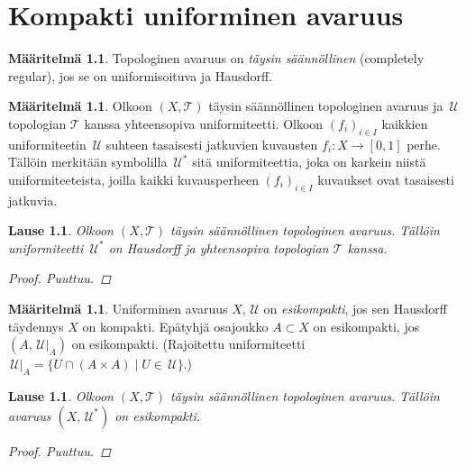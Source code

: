 \documentclass[12pt,a4paper,leqno]{report}
\newcommand{\U}{\,\mathcal{U}}
\newcommand{\T}{\mathcal{T}}
\theoremstyle{plain}
\newtheorem{lause}[equation]{Lause}
\theoremstyle{definition}
\newtheorem{maar}[equation]{Määritelmä}
\theoremstyle{remark}
\begin{document}
\chapter{Kompakti uniforminen avaruus}

\begin{maar}
Topologinen avaruus on \emph{täysin säännöllinen} (completely regular), 
jos se on uniformisoituva ja Hausdorff.
\end{maar}

\begin{maar}
Olkoon $(X,\T)$ täysin säännöllinen topologinen avaruus 
ja $\U$ topologian $\T$ kanssa yhteensopiva uniformiteetti. 
Olkoon $(f_i)_{i\in I}$ kaikkien uniformiteetin $\U$ suhteen tasaisesti jatkuvien kuvausten $f_i\colon X\rightarrow [0,1]$ perhe. 
Tällöin merkitään symbolilla $\U^*$ sitä uniformiteettia, 
joka on karkein niistä uniformiteeteista, 
joilla kaikki kuvausperheen $(f_i)_{i\in I}$ 
kuvaukset %
ovat tasaisesti jatkuvia. 
\end{maar}

\begin{lause}
Olkoon $(X,\T)$ täysin säännöllinen topologinen avaruus. 
Tällöin uniformiteetti $\U^*$ on Hausdorff ja yhteensopiva topologian $\T$ kanssa. 
\begin{proof}
Puuttuu.
\end{proof}
\end{lause}

\begin{maar}
Uniforminen avaruus $X,\U$ on \emph{esikompakti}, 
jos sen Hausdorff täydennys %
$\hat{X}$ on kompakti. 
Epätyhjä osajoukko $A\subset X$ on esikompakti, jos $(A,\U\vert _A)$ on esikompakti. 
(Rajoitettu uniformiteetti $\U\vert _A=\{U\cap (A\times A)\mid U\in\U\}$.)
\end{maar}

\begin{lause}
Olkoon $(X,\T)$ täysin säännöllinen topologinen avaruus. 
Tällöin avaruus $(X,\U^*)$ on esikompakti.
\begin{proof}
Puuttuu.
\end{proof}
\end{lause}
\end{document}
